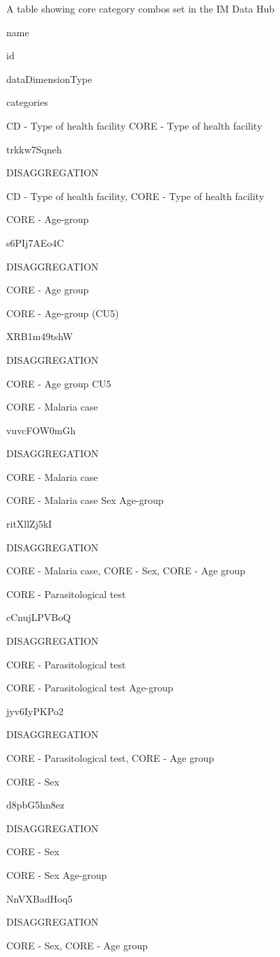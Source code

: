 \documentclass[]{book}
\begin{document}
\label{tab:unnamed-chunk-16}A table showing core category combos set in the IM Data Hub

name

id

dataDimensionType

categories

CD - Type of health facility \textbar{} CORE - Type of health facility

trkkw7Sqneh

DISAGGREGATION

CD - Type of health facility, CORE - Type of health facility

CORE - Age-group

s6PIj7AEo4C

DISAGGREGATION

CORE - Age group

CORE - Age-group (CU5)

XRB1m49tshW

DISAGGREGATION

CORE - Age group CU5

CORE - Malaria case

vuvcFOW0mGh

DISAGGREGATION

CORE - Malaria case

CORE - Malaria case \textbar{} Sex \textbar{} Age-group

ritXllZj5kI

DISAGGREGATION

CORE - Malaria case, CORE - Sex, CORE - Age group

CORE - Parasitological test

cCnujLPVBoQ

DISAGGREGATION

CORE - Parasitological test

CORE - Parasitological test \textbar{} Age-group

jyv6IyPKPo2

DISAGGREGATION

CORE - Parasitological test, CORE - Age group

CORE - Sex

d8pbG5hn8ez

DISAGGREGATION

CORE - Sex

CORE - Sex \textbar{} Age-group

NnVXBadHoq5

DISAGGREGATION

CORE - Sex, CORE - Age group
\end{document}
